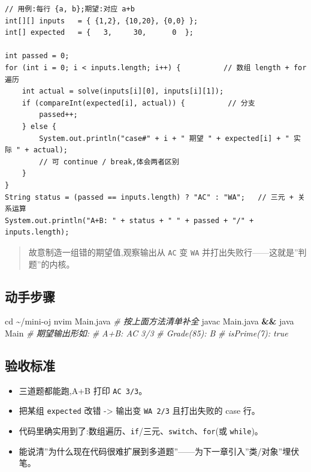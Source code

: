\documentclass[
  11pt,
]{ctexart}
\newenvironment{Shaded}{\begin{snugshade}}{\end{snugshade}}
\newcommand{\BuiltInTok}[1]{#1}
\newcommand{\CommentTok}[1]{\textcolor[rgb]{0.56,0.35,0.01}{\textit{#1}}}
\newcommand{\ExtensionTok}[1]{#1}
\newcommand{\KeywordTok}[1]{\textcolor[rgb]{0.13,0.29,0.53}{\textbf{#1}}}
\newcommand{\NormalTok}[1]{#1}
\providecommand{\tightlist}{%
  \setlength{\itemsep}{0pt}\setlength{\parskip}{0pt}}
\begin{document}
\begin{verbatim}
// 用例:每行 {a, b};期望:对应 a+b
int[][] inputs   = { {1,2}, {10,20}, {0,0} };
int[] expected   = {   3,     30,      0  };

int passed = 0;
for (int i = 0; i < inputs.length; i++) {          // 数组 length + for 遍历
    int actual = solve(inputs[i][0], inputs[i][1]);
    if (compareInt(expected[i], actual)) {          // 分支
        passed++;
    } else {
        System.out.println("case#" + i + " 期望 " + expected[i] + " 实际 " + actual);
        // 可 continue / break,体会两者区别
    }
}
String status = (passed == inputs.length) ? "AC" : "WA";   // 三元 + 关系运算
System.out.println("A+B: " + status + " " + passed + "/" + inputs.length);
\end{verbatim}

\begin{quote}
故意制造一组错的期望值,观察输出从 \texttt{AC} 变 \texttt{WA}
并打出失败行------这就是''判题''的内核。
\end{quote}

\hypertarget{ux52a8ux624bux6b65ux9aa4-1}{%
\subsection{动手步骤}\label{ux52a8ux624bux6b65ux9aa4-1}}

\begin{Shaded}
\begin{Highlighting}[]
\BuiltInTok{cd}\NormalTok{ \textasciitilde{}/mini{-}oj}
\ExtensionTok{nvim}\NormalTok{ Main.java            }\CommentTok{\# 按上面方法清单补全}
\ExtensionTok{javac}\NormalTok{ Main.java }\KeywordTok{\&\&} \ExtensionTok{java}\NormalTok{ Main}
\CommentTok{\# 期望输出形如:}
\CommentTok{\#   A+B: AC 3/3}
\CommentTok{\#   Grade(85): B}
\CommentTok{\#   isPrime(7): true}
\end{Highlighting}
\end{Shaded}

\hypertarget{ux9a8cux6536ux6807ux51c6-1}{%
\subsection{验收标准}\label{ux9a8cux6536ux6807ux51c6-1}}

\begin{itemize}
\tightlist
\item[$\square$]
  三道题都能跑,A+B 打印 \texttt{AC\ 3/3}。
\item[$\square$]
  把某组 \texttt{expected} 改错 -\textgreater{} 输出变 \texttt{WA\ 2/3}
  且打出失败的 case 行。
\item[$\square$]
  代码里确实用到了:数组遍历、\texttt{if}/三元、\texttt{switch}、\texttt{for}(或
  \texttt{while})。
\item[$\square$]
  能说清''为什么现在代码很难扩展到多道题''------为下一章引入''类/对象''埋伏笔。
\end{itemize}
\end{document}
